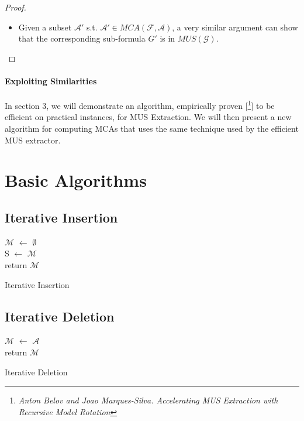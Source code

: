 \documentclass[]{article}
\begin{document}
\begin{proof}
\begin{itemize}
		\item Given a subset $ \mathcal{A}'$ s.t. $ \mathcal{A}' \in MCA(\mathcal{F,A}) $, a very similar argument can show that the corresponding sub-formula $ {G}' $ is in $ MUS(\mathcal{G})$.
	\end{itemize}
	\end{proof}

	\paragraph{Exploiting Similarities} In section 3, we will demonstrate an algorithm, empirically proven [\footnote{\textit{Anton Belov and Joao Marques-Silva. Accelerating MUS Extraction with Recursive Model Rotation}}] to be efficient on practical instances, for MUS Extraction. We will then present a new algorithm for computing MCAs that uses the same technique used by the efficient MUS extractor.

	\section{Basic Algorithms}
	\subsection{Iterative Insertion}
		\begin{algorithm}[H]
		$ \mathcal{M} $ $\leftarrow$ $\emptyset$\\
		 {
			S $\leftarrow$ $ \mathcal{M} $\\
		}
		return $ \mathcal{M} $
		\caption{Iterative Insertion}
	\end{algorithm}
	\subsection{Iterative Deletion}
			\begin{algorithm}[H]
		$ \mathcal{M} $ $\leftarrow$ $ \mathcal{A} $\\
		 {
		}
		return $ \mathcal{M} $
		\caption{Iterative Deletion}
	\end{algorithm}
\end{document}
